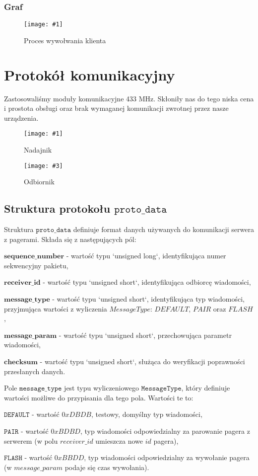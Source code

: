 \documentclass[12pt]{article}
\let\tempone\itemize
\let\temptwo\enditemize
\renewenvironment{itemize}{\tempone\setlength{\itemsep}{0cm}}{\temptwo}
\newcommand{\imgcustomsize}[3]{
	\begin{figure}[H]
		\centering
		\texttt{[image: \#1]}
		\caption{#2}
	\end{figure}
}
\newcommand{\img}[2]{\imgcustomsize{#1}{#2}{0.8}}
\newcommand{\imgsidebyside}[4]{
	\begin{figure}[H]
		\centering
		\begin{minipage}{.45\textwidth}
			\centering
			\texttt{[image: \#1]}
			\caption{#2}
		\end{minipage}%
		\hfill
		\begin{minipage}{.45\textwidth}
			\centering
			\texttt{[image: \#3]}
			\caption{#4}
		\end{minipage}
	\end{figure}
}
\begin{document}
        \subsubsection{Graf}
        \img{graphs/flashing}{Proces wywołwania klienta}

    \pagebreak

    \section{Protokół komunikacyjny}
		Zastosowaliśmy moduły komunikacyjne 433 MHz. Skłoniły nas do tego niska cena i prostota obsługi oraz brak wymaganej komunikacji zwrotnej przez nasze urządzenia.

        \imgsidebyside{dev/tx}{Nadajnik}{dev/rx}{Odbiornik}

        \subsection{Struktura protokołu $\texttt{proto\_data}$}

        Struktura $\texttt{proto\_data}$ definiuje format danych używanych do komunikacji serwera z pagerami. Składa się z następujących pól:

        \begin{itemize}
            \item $\mathbf{sequence\_number}$ - wartość typu `unsigned long`, identyfikująca numer sekwencyjny pakietu,
            \item $\mathbf{receiver\_id}$ - wartość typu `unsigned short`, identyfikująca odbiorcę wiadomości,
            \item $\mathbf{message\_type}$ - wartość typu `unsigned short`, identyfikująca typ wiadomości, przyjmująca wartości z wyliczenia $MessageType$: $DEFAULT$, $PAIR$ oraz $FLASH$,
            \item $\mathbf{message\_param}$ - wartość typu `unsigned short`, przechowująca parametr wiadomości,
            \item $\mathbf{checksum}$ - wartość typu `unsigned short`, służąca do weryfikacji poprawności przesłanych danych.
        \end{itemize}

        Pole $\texttt{message\_type}$ jest typu wyliczeniowego $\texttt{MessageType}$, który definiuje wartości możliwe do przypisania dla tego pola. Wartości te to:
        \begin{itemize}
            \item $\texttt{DEFAULT}$ - wartość $0xDBDB$, testowy, domyślny typ wiadomości,
            \item $\texttt{PAIR}$ - wartość $0xBDBD$, typ wiadomości odpowiedzialny za parowanie pagera z serwerem (w polu $receiver\_id$ umieszcza nowe $id$ pagera),
            \item $\texttt{FLASH}$ - wartość $0xBBDD$, typ wiadomości odpowiedzialny za wywołanie pagera (w $message\_param$ podaje się czas wywołania).
        \end{itemize}
\end{document}
